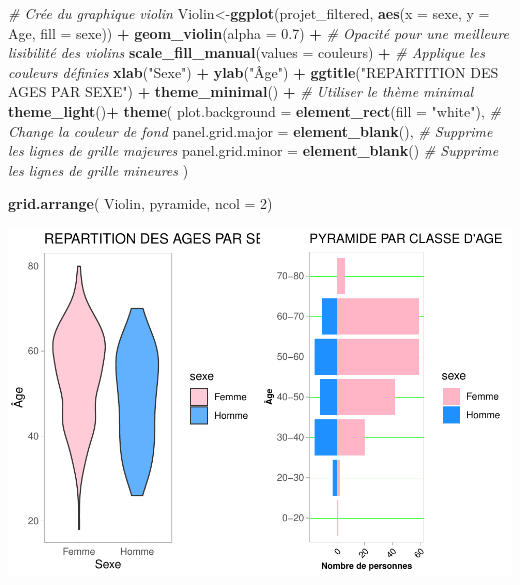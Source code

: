 \documentclass[
]{article}
\newenvironment{Shaded}{\begin{snugshade}}{\end{snugshade}}
\newcommand{\AttributeTok}[1]{\textcolor[rgb]{0.13,0.29,0.53}{#1}}
\newcommand{\CommentTok}[1]{\textcolor[rgb]{0.56,0.35,0.01}{\textit{#1}}}
\newcommand{\DecValTok}[1]{\textcolor[rgb]{0.00,0.00,0.81}{#1}}
\newcommand{\FloatTok}[1]{\textcolor[rgb]{0.00,0.00,0.81}{#1}}
\newcommand{\FunctionTok}[1]{\textcolor[rgb]{0.13,0.29,0.53}{\textbf{#1}}}
\newcommand{\NormalTok}[1]{#1}
\newcommand{\OtherTok}[1]{\textcolor[rgb]{0.56,0.35,0.01}{#1}}
\newcommand{\SpecialCharTok}[1]{\textcolor[rgb]{0.81,0.36,0.00}{\textbf{#1}}}
\newcommand{\StringTok}[1]{\textcolor[rgb]{0.31,0.60,0.02}{#1}}
\begin{document}
\begin{Shaded}
\begin{Highlighting}[]
\CommentTok{\# Crée du graphique violin}
\NormalTok{Violin}\OtherTok{\textless{}{-}}\FunctionTok{ggplot}\NormalTok{(projet\_filtered, }\FunctionTok{aes}\NormalTok{(}\AttributeTok{x =}\NormalTok{ sexe, }\AttributeTok{y =}\NormalTok{ Age, }\AttributeTok{fill =}\NormalTok{ sexe)) }\SpecialCharTok{+}
  \FunctionTok{geom\_violin}\NormalTok{(}\AttributeTok{alpha =} \FloatTok{0.7}\NormalTok{) }\SpecialCharTok{+}  \CommentTok{\# Opacité pour une meilleure lisibilité des violins}
  \FunctionTok{scale\_fill\_manual}\NormalTok{(}\AttributeTok{values =}\NormalTok{ couleurs) }\SpecialCharTok{+}  \CommentTok{\# Applique les couleurs définies}
  \FunctionTok{xlab}\NormalTok{(}\StringTok{"Sexe"}\NormalTok{) }\SpecialCharTok{+}
  \FunctionTok{ylab}\NormalTok{(}\StringTok{"Âge"}\NormalTok{) }\SpecialCharTok{+}
  \FunctionTok{ggtitle}\NormalTok{(}\StringTok{"REPARTITION DES AGES PAR SEXE"}\NormalTok{) }\SpecialCharTok{+}
  \FunctionTok{theme\_minimal}\NormalTok{() }\SpecialCharTok{+}  \CommentTok{\# Utiliser le thème minimal}
  \FunctionTok{theme\_light}\NormalTok{()}\SpecialCharTok{+}
  \FunctionTok{theme}\NormalTok{(}
    \AttributeTok{plot.background =} \FunctionTok{element\_rect}\NormalTok{(}\AttributeTok{fill =} \StringTok{"white"}\NormalTok{),  }\CommentTok{\# Change la couleur de fond}
    \AttributeTok{panel.grid.major =} \FunctionTok{element\_blank}\NormalTok{(),  }\CommentTok{\# Supprime les lignes de grille majeures}
    \AttributeTok{panel.grid.minor =} \FunctionTok{element\_blank}\NormalTok{()  }\CommentTok{\# Supprime les lignes de grille mineures}
\NormalTok{  )}

\FunctionTok{grid.arrange}\NormalTok{( Violin, pyramide, }\AttributeTok{ncol =} \DecValTok{2}\NormalTok{)}
\end{Highlighting}
\end{Shaded}

\begin{center}\includegraphics{Projet_R_ISE_1_files/figure-latex/unnamed-chunk-30-1} \end{center}
\end{document}

